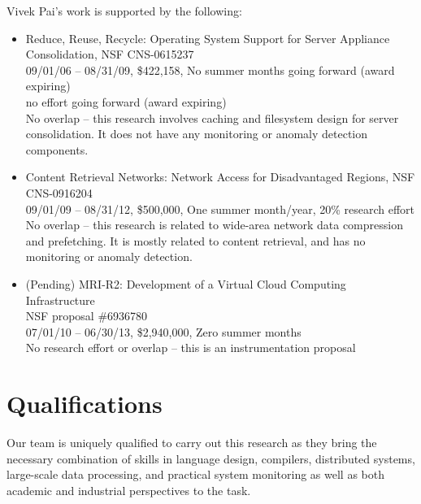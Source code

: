 \documentclass[12pt]{article}
\begin{document}
\noindent
Vivek Pai's work is supported by the following:

\begin{itemize}


\item Reduce, Reuse, Recycle:  Operating System Support for Server Appliance Consolidation, 
NSF CNS-0615237\\
09/01/06 -- 08/31/09, \$422,158, No summer months going forward (award expiring) \\
no effort going forward (award expiring) \\
No overlap -- this research involves caching and filesystem design for server
consolidation. It does not have any monitoring or anomaly detection components.

\item Content Retrieval Networks:  Network Access for Disadvantaged Regions, 
NSF CNS-0916204\\
09/01/09 -- 08/31/12, \$500,000, One summer month/year,
20\% research effort \\
No overlap -- this research is related to wide-area network data compression and prefetching. It is mostly related to content retrieval, and has no
monitoring or anomaly detection.

\item (Pending) MRI-R2: Development of a Virtual Cloud Computing Infrastructure \\
NSF proposal \#6936780\\
07/01/10 -- 06/30/13, \$2,940,000, Zero summer months \\
No research effort or overlap -- this is an instrumentation proposal


\end{itemize}





\section{Qualifications}

Our team is uniquely qualified to carry out this research as they
bring the necessary combination of skills in language design,
compilers, distributed systems, large-scale data processing, and
practical system monitoring as well as both academic and industrial
perspectives to the task.  
\end{document}
